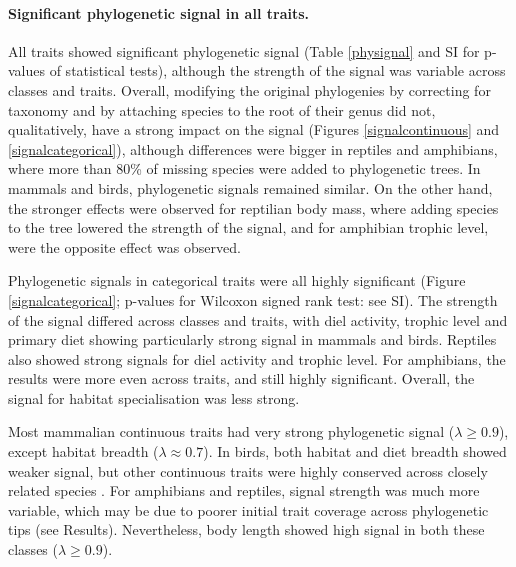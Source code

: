 \paragraph{Significant phylogenetic signal in all traits.}
All traits showed significant phylogenetic signal (Table \ref{physignal} and SI for p-values of statistical tests), although the strength of the signal was variable across classes and traits. Overall, modifying the original phylogenies by correcting for taxonomy and by attaching species to the root of their genus did not, qualitatively, have a strong impact on the signal (Figures \ref{signalcontinuous} and \ref{signalcategorical}), although differences were bigger in reptiles and amphibians, where more than 80\% of missing species were added to phylogenetic trees. In mammals and birds, phylogenetic signals remained similar. On the other hand, the stronger effects were observed for reptilian body mass, where adding species to the tree lowered the strength of the signal, and for amphibian trophic level, were the opposite effect was observed.

Phylogenetic signals in categorical traits were all highly significant (Figure \ref{signalcategorical}; p-values for Wilcoxon signed rank test: see SI). The strength of the signal differed across classes and traits, with diel activity, trophic level and primary diet showing particularly strong signal in mammals and birds. Reptiles also showed strong signals for diel activity and trophic level. For amphibians, the results were more even across traits, and still highly significant. Overall, the signal for habitat specialisation was less strong.

Most mammalian continuous traits had very strong phylogenetic signal ($\lambda \geq 0.9$), except habitat breadth ($\lambda \approx 0.7$). In birds, both habitat and diet breadth showed weaker signal, but other continuous traits were highly conserved across closely related species . For amphibians and reptiles, signal strength was much more variable, which may be due to poorer initial trait coverage across phylogenetic tips (see Results). Nevertheless, body length showed high signal in both these classes ($\lambda \geq 0.9$). 


